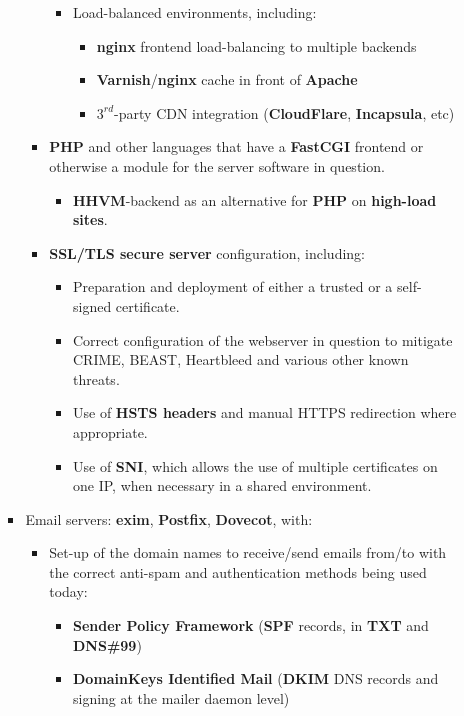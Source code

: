 \documentclass[12pt,a4paper]{article}
\begin{document}
\begin{itemize}
\begin{itemize}
\begin{itemize}
\begin{itemize}
\begin{itemize}
					\item	Load-balanced environments, including:
						\begin{itemize}
						\item	\textbf{nginx} frontend load-balancing to multiple backends
						\item	\textbf{Varnish}/\textbf{nginx} cache in front of \textbf{Apache}
						\item	$3^{rd}$-party CDN integration (\textbf{CloudFlare}, \textbf{Incapsula}, etc)
						\end{itemize}
					\end{itemize}
				\item	\textbf{PHP} and other languages that have a \textbf{FastCGI} frontend or otherwise a module for the server software in question.
					\begin{itemize}
					\item	\textbf{HHVM}-backend as an alternative for \textbf{PHP} on \textbf{high-load sites}.
					\end{itemize}
				\item	\textbf{SSL/TLS secure server} configuration, including:
					\begin{itemize}
					\item	Preparation and deployment of either a trusted or a self-signed certificate.
					\item	Correct configuration of the webserver in question to mitigate CRIME, BEAST, Heartbleed and various other known threats.
					\item	Use of \textbf{HSTS headers} and manual HTTPS redirection where appropriate.
					\item	Use of \textbf{SNI}, which allows the use of multiple certificates on one IP, when necessary in a shared environment.
					\end{itemize}
				\end{itemize}
			\item	Email servers: \textbf{exim}, \textbf{Postfix}, \textbf{Dovecot}, with:
				\begin{itemize}
				\item	Set-up of the domain names to receive/send emails from/to with the correct anti-spam and authentication methods being used today:
					\begin{itemize}
					\item	\textbf{Sender Policy Framework} (\textbf{SPF} records, in \textbf{TXT} and \textbf{DNS\#99})
					\item	\textbf{DomainKeys Identified Mail} (\textbf{DKIM} DNS records and signing at the mailer daemon level)

\end{itemize}
\end{itemize}
\end{itemize}
\end{itemize}
\end{itemize}
\end{document}
